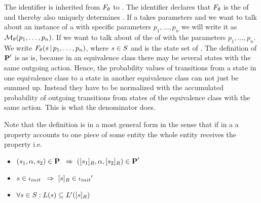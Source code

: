 \documentclass[preview]{standalone}
\begin{document}
The identifier \viewppty is inherited from ${F_{{\theta}}}$ to \view. The identifier declares that ${F_{{\theta}}}$ is the \grpfctN of \view and thereby also uniquely determines \view. If a \viewN takes parameters and we want to talk about an instance of a \viewN with specific parameters $p_1, \dots, p_n$ we will write it as ${{{{\mathcal{M}}}}_{{\theta}}}(p_1, \dots, p_n)$. If we want to talk about of the \grpfctN \grpfct of \view with the parameters $p_1, \dots, p_n$. We write ${F_{{\theta}}}({s} {\,|\,} p_1, \dots, p_n)$, where ${s} \in {S}$ and \states is the state set of \chgph. The definition of ${{\textbf{P}}}'$ is as is, because in an equivalence class there may be several states with the same outgoing action. Hence, the probability values of transitions from a state in one equivalence class to a state in another equivalence class can not just be summed up. Instead they have to be normalized with the accumulated probability of outgoing transitions from states of the equivalence class with the same action. This is what the denominator does.

Note that the definition is in a most general form in the sense that if in a \viewN a property accounts to one piece of some entity the whole entity receives the property i.e. 
\begin{itemize}	
	\item $({s}_1, {\alpha}, {s}_2) \in {\ensuremath{{\textbf{P}}}} {\hspace{3mm}\Rightarrow\hspace{2mm}} ({{[{s}_1]_{{R}}}}, {\alpha}, {{[{s}_2]_{{R}}}}) \in {\ensuremath{{\textbf{P}}}}'$
	\item ${s} \in {\ensuremath{{\iota_{init}}}} {\hspace{3mm}\Rightarrow\hspace{2mm}} {\ensuremath{{[{s}]_{{R}}}}} \in {\iota_{init}}'$
	\item $\forall {s} \in {S} : {L}({s}) \subseteq {L}'({{[{s}]_{{R}}}})$
\end{itemize}
\end{document}
